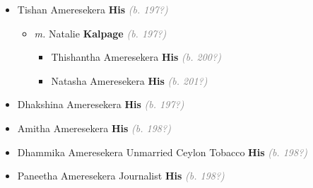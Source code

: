 \documentclass[10pt, openany]{book}
\begin{document}
\begin{itemize}
{\begin{itemize}
{\begin{itemize}
{\begin{itemize}
{  }
\item{Tishan Ameresekera \textbf{His} \textcolor{gray}{\textit{(b. 197?)}}
\begin{itemize}
\item{\textit{m.} Natalie \textbf{Kalpage} \textcolor{gray}{\textit{(b. 197?)}}   \label{couple:00003344:00003345} \begin{itemize}
\item{Thishantha Ameresekera \textbf{His} \textcolor{gray}{\textit{(b. 200?)}}
  }
\item{Natasha Ameresekera \textbf{His} \textcolor{gray}{\textit{(b. 201?)}}
  }
\end{itemize}}
\end{itemize}
  }
\item{Dhakshina Ameresekera \textbf{His} \textcolor{gray}{\textit{(b. 197?)}}
  }
\item{Amitha Ameresekera \textbf{His} \textcolor{gray}{\textit{(b. 198?)}}
  }
\item{Dhammika Ameresekera Unmarried Ceylon Tobacco \textbf{His} \textcolor{gray}{\textit{(b. 198?)}}
     }
\item{Paneetha Ameresekera Journalist \textbf{His} \textcolor{gray}{\textit{(b. 198?)}}
   }
\end{itemize}}
\end{itemize}
     }
\end{itemize}}
\end{itemize}
  
\end{document}
